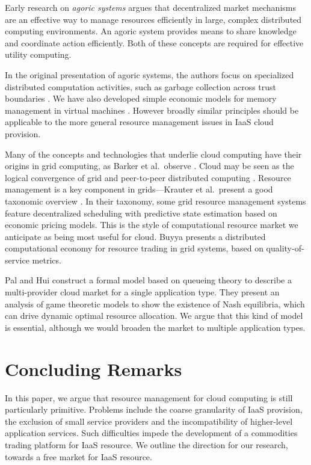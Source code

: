 \documentclass[conference,10pt]{IEEEtran}
\begin{document}
Early research on \emph{agoric systems}  \cite{miller88markets} argues that decentralized market mechanisms are an effective way to manage resources efficiently in large, complex distributed computing environments. An agoric system provides means to share knowledge and coordinate action efficiently. Both of these concepts are required for effective utility computing.

In the original presentation of agoric systems, the authors focus on specialized distributed computation activities, such as garbage collection across trust boundaries \cite{miller88incentive}. We have also developed simple economic models for memory management in virtual machines \cite{singer10economics,cameron15judgment}.  However broadly similar principles should be applicable to the more general resource management issues in IaaS cloud provision.


Many of the concepts and technologies that underlie cloud computing have their origins in grid computing, as Barker et al.\ observe \cite{barker14academic}.
Cloud may be seen as the logical convergence of grid and peer-to-peer distributed computing \cite{foster03death}.
Resource management is a key component in grids---Krauter et al.\ present a good taxonomic overview \cite{krauter02taxonomy}. In their taxonomy, some grid resource management systems feature decentralized scheduling with predictive state estimation based on economic pricing models. This is the style of computational resource market we anticipate as being most useful for cloud.
Buyya \cite{buyya02economic} presents a distributed computational economy for resource trading in grid systems, based on quality-of-service metrics.

Pal and Hui \cite{pal13economic} construct a formal model based on queueing theory to describe a multi-provider cloud market for a single application type. They present an analysis of game theoretic models to show the existence of Nash equilibria, which can drive dynamic optimal resource allocation.
We argue that this kind of model is essential, although we would broaden the market to multiple application types.


\section{Concluding Remarks}
\label{sec-concl}

In this paper, we argue that resource management for cloud computing is still particularly primitive. 
Problems include the coarse granularity of IaaS provision, the exclusion of small service providers and the incompatibility of higher-level application services.
Such difficulties impede the development of a commodities trading platform for IaaS resource. 
We outline the direction for our research, towards a free market for IaaS resource.





\end{document}
